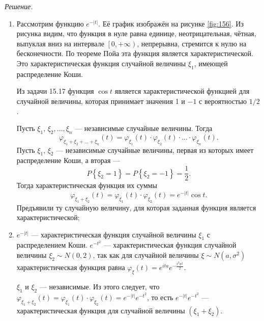 \textit{Решение.}
\begin{enumerate}[label=\alph*)]
\item Рассмотрим функцию $e^{- \left| t \right| }$.
Её график изображён на рисунке \ref{fig:156}.
Из рисунка видим, что функция в нуле равна единице, неотрицательная, чётная, выпуклая вниз на интервале $ \left[ 0, + \infty \right) $, непрерывна,
стремится к нулю на бесконечности.
По теореме Пойа эта функция является характеристической.
Это характеристическая функция случайной величины $ \xi_1$, имеющей распределение Коши.

Из задачи 15.17 функция $ \cos t$ является характеристической функцией для случайной величины, которая принимает значения 1 и $- 1$ с вероятностью $1 / 2$.

Пусть $ \xi_1, \, \xi_2, \dotsc, \xi_n$ --- независимые случайные величины.
Тогда
$$ \varphi_{ \xi_1 + \xi_2 + \dotsc + \xi_n} \left( t \right) =
\varphi_{ \xi_1} \left( t \right) \cdot \varphi_{ \xi_2} \left( t \right) \cdot \dotsc \cdot \varphi_{ \xi_n} \left( t \right).$$
Пусть $ \xi_1, \, \xi_2$ --- независимые случайные величины, первая из которых имеет распределение Коши, а вторая ---
$$P \left\{ \xi_2 = 1 \right\} =
P \left\{ \xi_2 = - 1 \right\} =
\frac{1}{2}.$$
Тогда характеристическая функция их суммы
$$ \varphi_{ \xi_1 + \xi_2} \left( t \right) =
\varphi_{ \xi_1} \left( t \right) \cdot \varphi_{ \xi_2} \left( t \right) =
e^{- \left| t \right| } \cos t.$$
Предъявили ту случайную величину, для которая заданная функция является характеристической;
\item $e^{- \left| t \right| }$ --- характеристическая функция случайной величины $ \xi_1$ с распределением Коши.
$e^{- t^2}$ --- характеристическая функция случайной величины $ \xi_2 \sim N \left( 0, 2 \right) $,
так как для случайной величины $ \xi \sim N \left( a, \sigma^2 \right) $ характеристическая функция равна
$ \varphi_{ \xi } \left( t \right) =
e^{ita}e^{- \frac{t^2 \sigma^2}{2}}$.

$ \xi_1$ и $ \xi_2$ --- независимые.
Из этого следует,
что $ \varphi_{ \xi_1 + \xi_2} \left( t \right) = \varphi_{ \xi_1} \left( t \right) \cdot \varphi_{ \xi_2} \left( t \right) = e^{- \left| t \right| } e^{- t^2}$,
то есть $e^{- \left| t \right| } e^{- t^2}$ --- характеристическая функция для случайной величины $ \left( \xi_1 + \xi_2 \right) $.


\end{enumerate}
